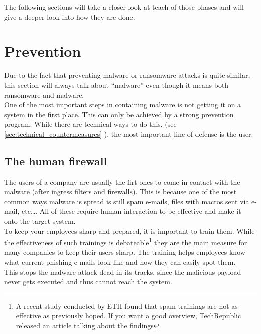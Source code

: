 The following sections will take a closer look at teach of those phases and will give a deeper look into how they are done.

\section{Prevention}

Due to the fact that preventing malware or ransomware attacks is quite similar, this section will always talk about \enquote{malware} even though it means both ransomware and malware.
\\

One of the most important steps in containing malware is not getting it on a system in the first place.
This can only be achieved by a strong prevention program.
While there are technical ways to do this, (see \autoref{sec:technical_countermeasures} ), the most important line of defense is the user.
\\

\subsection{The human firewall}

The users of a company are usually the firt ones to come in contact with the malware (after ingress filters and firewalls).
This is because one of the most common ways malware is spread is still spam e-mails, files with macros sent via e-mail, etc\dots.
All of these require human interaction to be effective and make it onto the target system.
\\

To keep your employees sharp and prepared, it is important to train them.
While the effectiveness of such trainings is debateable\footnote{A recent study conducted by ETH found that spam trainings are not as effective as previously hoped.
If you want a good overview, TechRepublic released an article talking about the findings
}
they are the main measure for many companies to keep their users sharp.
The training helps employees know what current phishing e-mails look like and how they can easily spot them.
\\

This stops the malware attack dead in its tracks, since the malicious payload never gets executed and thus cannot reach the system.
\\

